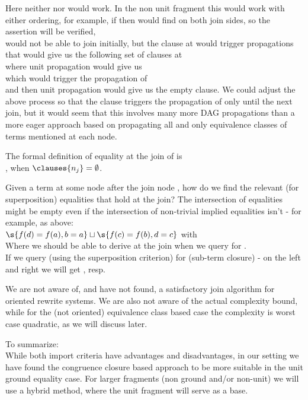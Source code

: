 Here neither  nor  would work.
In the non unit fragment this would work with either ordering, for example, if  then 
 would find  on both join sides, so the assertion will be verified,\\
 would not be able to join initially, but the clause  at  would trigger propagations that would give us the following set of clauses at  \\
 where unit propagation would give us \\
 which would trigger the propagation of \\
 and then unit propagation would give us the empty clause.
We could adjust the above process so that the clause  triggers the propagation of  only until the next join,
but it would seem that this involves many more DAG propagations than a more eager approach based on propagating all and only equivalence classes of terms mentioned at each node.

The formal definition of equality at the join  of  is \\
, when $\clauses{n_j}=\emptyset$.

Given a term  at some node after the join node , how do we find the relevant (for superposition) equalities that hold at the join? The intersection of equalities might be empty even if the intersection of non-trivial implied equalities isn't - for example, as above: \\
$\s{f(d)=f(a),b=a} \sqcup \s{f(c)=f(b),d=c}$ with \\
Where we should be able to derive at the join  when we query for .\\
If we query (using the superposition criterion) for  (sub-term closure) - on the left and right we will get , resp.

We are not aware of, and have not found, a satisfactory join algorithm for oriented rewrite systems. 
We are also not aware of the actual complexity bound, while for the (not oriented) equivalence class based case the complexity is worst case quadratic, as we will discuss later.

To summarize:\\
While both import criteria have advantages and disadvantages, in our setting we have found the congruence closure based approach to be more suitable in the unit ground equality case.
For larger fragments (non ground and/or non-unit) we will use a hybrid method, where the unit fragment will serve as a base.

